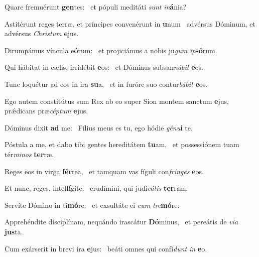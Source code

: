 \item Quare fremuérunt \textbf{gen}tes:~\psstar{} et pópuli meditáti \textit{sunt} \textit{in}\textbf{á}nia?
\item Astitérunt reges terræ, et príncipes convenérunt in \textbf{u}num~\psstar{} advérsus Dóminum, et advérsus \textit{Christum} \textbf{e}jus.
\item Dirumpámus víncula e\textbf{ó}rum:~\psstar{} et projiciámus a nobis ju\textit{gum} \textit{ip}\textbf{só}rum.
\item Qui hábitat in cælis, irridébit \textbf{e}os:~\psstar{} et Dóminus subsan\textit{nábit} \textbf{e}os.
\item Tunc loquétur ad eos in ira \textbf{su}a,~\psstar{} et in furóre suo contur\textit{bábit} \textbf{e}os.
\item Ego autem constitútus sum Rex ab eo super Sion montem sanctum \textbf{e}jus,~\psstar{} prǽdicans præ\textit{céptum} \textbf{e}jus.
\item Dóminus dixit \textbf{ad} me:~\psstar{} Fílius meus es tu, ego hódie \textit{génu}\textbf{i} te.
\item Póstula a me, et dabo tibi gentes hereditátem \textbf{tu}am,~\psstar{} et possessiónem tuam tér\textit{minos} \textbf{ter}ræ.
\item Reges eos in virga \textbf{fér}rea,~\psstar{} et tamquam vas fíguli con\textit{frínges} \textbf{e}os.
\item Et nunc, reges, intel\textbf{lí}gite:~\psstar{} erudímini, qui judi\textit{cátis} \textbf{ter}ram.
\item Servíte Dómino in ti\textbf{mó}re:~\psstar{} et exsultáte ei \textit{cum} \textit{tre}\textbf{mó}re.
\item Apprehéndite disciplínam, nequándo irascátur \textbf{Dó}minus,~\psstar{} et pereátis de \textit{via} \textbf{jus}ta.
\item Cum exárserit in brevi ira \textbf{e}jus:~\psstar{} beáti omnes qui confí\textit{dunt} \textit{in} \textbf{e}o.
